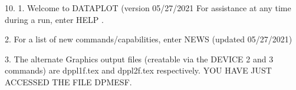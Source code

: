 10.
1. Welcome to DATAPLOT (version 05/27/2021  For assistance at
   any time during a run, enter HELP   .

2. For a list of new commands/capabilities,
   enter NEWS  (updated 05/27/2021)

3. The alternate Graphics output files (creatable
   via the DEVICE 2 and 3 commands) are
   dppl1f.tex and dppl2f.tex respectively.
YOU HAVE JUST ACCESSED THE FILE DPMESF.
